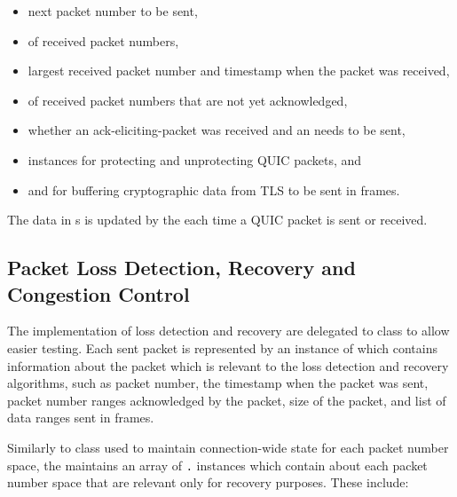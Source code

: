 \begin{itemize}

  \item next packet number to be sent,

  \item \PacketNumberWindow{} of received packet numbers,

  \item largest received packet number and timestamp when the packet was received,

  \item \RangeSet{} of received packet numbers that are not yet acknowledged,

  \item whether an \gls{ack-eliciting-packet} was received and an \ACK{} needs to be sent,

  \item \CryptoSeal{} instances for protecting and unprotecting QUIC packets, and

  \item \SendStream{} and \ReceiveStream{} for buffering cryptographic data from TLS to be sent in
\CRYPTO{} frames.

\end{itemize}

The data in \PacketNumberSpace{}s is updated by the \ManagedQuicConnection{} each time a QUIC packet
is sent or received.

\subsection{Packet Loss Detection, Recovery and Congestion Control}\label{sec:05-recovery}

The implementation of loss detection and recovery are delegated to \RecoveryController{} class to
allow easier testing. Each sent packet is represented by an instance of \SentPacket{} which contains
information about the packet which is relevant to the loss detection and recovery algorithms, such
as packet number, the timestamp when the packet was sent, packet number ranges acknowledged by the
packet, size of the packet, and list of data ranges sent in \STREAM{} frames.

Similarly to \PacketNumberSpace{} class used to maintain connection-wide state for each packet
number space, the \RecoveryController{} maintains an array of
\texttt{\RecoveryController{}.\PacketNumberSpace{}} instances which contain about each packet number
space that are relevant only for recovery purposes. These include:

